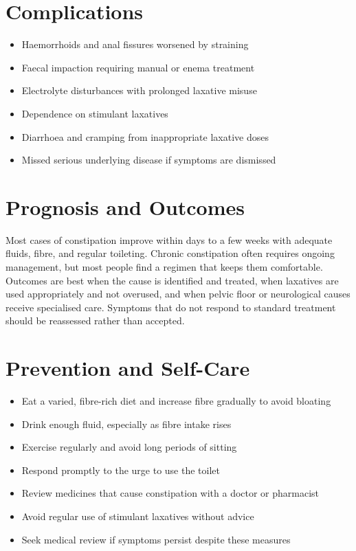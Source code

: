 \section*{Complications}
\begin{itemize}
    \item Haemorrhoids and anal fissures worsened by straining
    \item Faecal impaction requiring manual or enema treatment
    \item Electrolyte disturbances with prolonged laxative misuse
    \item Dependence on stimulant laxatives
    \item Diarrhoea and cramping from inappropriate laxative doses
    \item Missed serious underlying disease if symptoms are dismissed
\end{itemize}

\section*{Prognosis and Outcomes}
Most cases of constipation improve within days to a few weeks with adequate fluids, fibre, and regular toileting. Chronic constipation often requires ongoing management, but most people find a regimen that keeps them comfortable. Outcomes are best when the cause is identified and treated, when laxatives are used appropriately and not overused, and when pelvic floor or neurological causes receive specialised care. Symptoms that do not respond to standard treatment should be reassessed rather than accepted.

\section*{Prevention and Self-Care}
\begin{itemize}
    \item Eat a varied, fibre-rich diet and increase fibre gradually to avoid bloating
    \item Drink enough fluid, especially as fibre intake rises
    \item Exercise regularly and avoid long periods of sitting
    \item Respond promptly to the urge to use the toilet
    \item Review medicines that cause constipation with a doctor or pharmacist
    \item Avoid regular use of stimulant laxatives without advice
    \item Seek medical review if symptoms persist despite these measures
\end{itemize}

